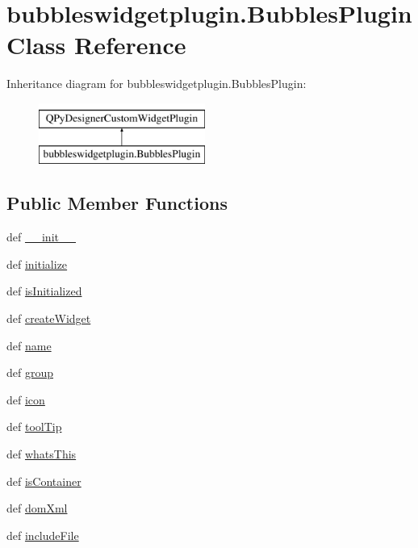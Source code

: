 \hypertarget{classbubbleswidgetplugin_1_1BubblesPlugin}{}\section{bubbleswidgetplugin.\+Bubbles\+Plugin Class Reference}
\label{classbubbleswidgetplugin_1_1BubblesPlugin}
Inheritance diagram for bubbleswidgetplugin.\+Bubbles\+Plugin\+:\begin{figure}[H]
\begin{center}
\leavevmode
\includegraphics[height=2.000000cm]{classbubbleswidgetplugin_1_1BubblesPlugin}
\end{center}
\end{figure}
\subsection*{Public Member Functions}
\begin{DoxyCompactItemize}
\item 
def \hyperlink{classbubbleswidgetplugin_1_1BubblesPlugin_a36faa1f04dc1c4281d98bfb857e8d00f}{\+\_\+\+\_\+init\+\_\+\+\_\+}
\item 
def \hyperlink{classbubbleswidgetplugin_1_1BubblesPlugin_a485484208bd69711e8f3f63312595a82}{initialize}
\item 
def \hyperlink{classbubbleswidgetplugin_1_1BubblesPlugin_a46bf94ee3bc928d57f71255292c2fbad}{is\+Initialized}
\item 
def \hyperlink{classbubbleswidgetplugin_1_1BubblesPlugin_ac4d8c6851559e0015b48581ed611383d}{create\+Widget}
\item 
def \hyperlink{classbubbleswidgetplugin_1_1BubblesPlugin_aa41547f65f2b9a77c64db66ad10f1e5d}{name}
\item 
def \hyperlink{classbubbleswidgetplugin_1_1BubblesPlugin_af75994b98848b2f716bfab8f929751a6}{group}
\item 
def \hyperlink{classbubbleswidgetplugin_1_1BubblesPlugin_a9e86bfa4bda3f2b72c8b6d97bed06d81}{icon}
\item 
def \hyperlink{classbubbleswidgetplugin_1_1BubblesPlugin_ad82ba1967620fa01b7763d155ce75eb5}{tool\+Tip}
\item 
def \hyperlink{classbubbleswidgetplugin_1_1BubblesPlugin_a29eedf7a1c056c3250e901f67fe2326b}{whats\+This}
\item 
def \hyperlink{classbubbleswidgetplugin_1_1BubblesPlugin_a3e103d4a5739e4f3a7ddbe1a67e13dc0}{is\+Container}
\item 
def \hyperlink{classbubbleswidgetplugin_1_1BubblesPlugin_a50fe57a649506c1dc354b63b4a8bdcfa}{dom\+Xml}
\item 
def \hyperlink{classbubbleswidgetplugin_1_1BubblesPlugin_aa5c474a72c726df1b2766ee99946a86d}{include\+File}
\end{DoxyCompactItemize}
